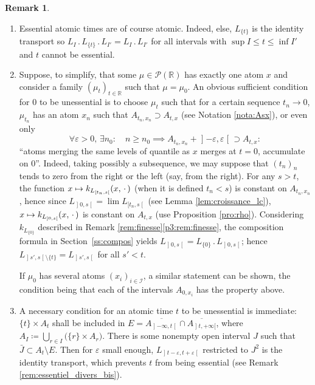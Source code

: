 \documentclass[JEP,XML,SOM,Unicode,NoEqCountersInSection,NoFloatCountersInSection,published]{cedram}
\newcommand{\ldot}{\mathbin{.}}
\newcommand\mto{\mathchoice{\longmapsto}{\mapsto}{\mapsto}{\mapsto}}
\theoremstyle{plain}
\theoremstyle{definition}
\newtheorem{rem}[them]{Remark}
\newcommand{\eqdef}{\coloneqq}
\newcommand{\espcdot}{\mbox{$\,\cdot\,$}}
\let\eps\varepsilon
\newcommand{\p}{\mathcal{P}}
\newcommand{\R}{\mathbb{R}}
\newcommand{\op}{\mathopen}
\newcommand{\clo}{\mathclose}
\begin{document}
\pagebreak[2]
\skpt
\begin{rem}\label{rem:essentiel_divers}
\begin{enumerate}
\item
Essential atomic times are of course atomic. Indeed, else, $L_{\{t\}}$ is the identity transport so $L_I\ldot L_{\{t\}}{}\ldot L_{I'}=L_I\ldot L_{I'}$ for all intervals with $\sup I\leqslant t \leqslant \inf I'$ and $t$ cannot be essential.

\item
\label{item:suffisante} Suppose, to simplify, that some $\mu\in\p(\R)$ has exactly one atom $x$ and consider a family $(\mu_t)_{t\in\R}$ such that $\mu=\mu_0$. An obvious sufficient condition for $0$ to be unessential is to choose $\mu_t$ such that for a certain sequence $t_n\to0$, $\mu_{t_n}$ has an atom $x_n$ such that $A_{t_n,x_n}\supset A_{t,x}$ (see Notation \ref{nota:Asx}), or even only
\[
\forall \varepsilon>0,\,\exists n_0:\quad n\geqslant n_0\implies A_{t_n,x_n}+\op]-\varepsilon,\varepsilon\clo[\supset A_{t,x}:
\]
``atoms merging the same levels of quantile as $x$ merges at $t=0$, accumulate on $0$''. Indeed, taking possibly a subsequence, we may suppose that $(t_n)_n$ tends to zero from the right or the left (say, from the right). For any $s>t$, the function $x\mto k_{L_{[t_n,s\clo[}}(x,\espcdot)$ (when it is defined \ie $t_n<s$) is constant on $A_{t_n,x_n}$, hence since $L_{\op]0,s\clo[}=\lim L_{[t_n,s\clo[}$ (see Lemma \ref{lem:croissance_lc}), $x\mto k_{L_{]0,s\clo[}}(x,\espcdot)$ is constant on $A_{t,x}$ (use Proposition \ref{pro:rho}). Considering $k_{L_{\{0\}}}$ described in Remark \ref{rem:finesse}\eqref{p3:rem:finesse}, the composition formula in Section~\ref{ss:compos} yields $L_{\op]0,s\clo[}=L_{\{0\}}{}\ldot L_{\op]0,s\clo[}$; hence $L_{\op]s',s\clo[\setminus\{t\}}=L_{\op]s',s\clo[}$ for all $s'<t$.

If $\mu_0$ has several atoms $(x_i)_{i\in\mathcal{I}}$, a similar statement can be shown, the condition being that each of the intervals $A_{0,x_i}$ has the property above.

\item
\label{item:necessaire} A necessary condition for an atomic time $t$ to be unessential is immediate: $\{t\}\times A_{t}$ shall be included in $E=\overline{A_{\op]-\infty,t\clo[}}\cap\overline{A_{\op]t,+\infty[}}$, where $A_{I}\eqdef\bigcup_{r\in I}\bigl(\{r\}\times A_{r}\bigr)$. There is some nonempty open interval $J$ such that $\bar{J}\subset A_t\setminus E$. Then for $\varepsilon$ small enough, $L_{\op]t-\eps,t+\eps\clo[}$ restricted to $J^2$ is the identity transport, which prevents $t$ from being essential (see Remark \ref{rem:essentiel_divers_bis}).


\end{enumerate}
\end{rem}
\end{document}
